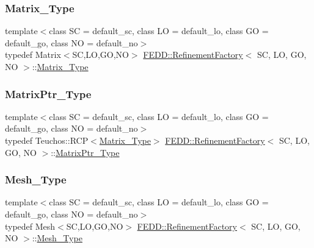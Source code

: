 \subsubsection{\texorpdfstring{Matrix\+\_\+\+Type}{Matrix\_Type}}
{\footnotesize\ttfamily template$<$class SC  = default\+\_\+sc, class LO  = default\+\_\+lo, class GO  = default\+\_\+go, class NO  = default\+\_\+no$>$ \\
typedef Matrix$<$SC,LO,GO,NO$>$ \hyperlink{classFEDD_1_1RefinementFactory}{F\+E\+D\+D\+::\+Refinement\+Factory}$<$ SC, LO, GO, NO $>$\+::\hyperlink{classFEDD_1_1RefinementFactory_ab04c3bb37b70c0524f46b050aaec1914}{Matrix\+\_\+\+Type}}

\mbox{\label{classFEDD_1_1RefinementFactory_a52d5a6625f207bc4df2c5ae3362e8ced}} 
\subsubsection{\texorpdfstring{Matrix\+Ptr\+\_\+\+Type}{MatrixPtr\_Type}}
{\footnotesize\ttfamily template$<$class SC  = default\+\_\+sc, class LO  = default\+\_\+lo, class GO  = default\+\_\+go, class NO  = default\+\_\+no$>$ \\
typedef Teuchos\+::\+R\+CP$<$\hyperlink{classFEDD_1_1RefinementFactory_ab04c3bb37b70c0524f46b050aaec1914}{Matrix\+\_\+\+Type}$>$ \hyperlink{classFEDD_1_1RefinementFactory}{F\+E\+D\+D\+::\+Refinement\+Factory}$<$ SC, LO, GO, NO $>$\+::\hyperlink{classFEDD_1_1RefinementFactory_a52d5a6625f207bc4df2c5ae3362e8ced}{Matrix\+Ptr\+\_\+\+Type}}

\mbox{\label{classFEDD_1_1RefinementFactory_a19f6ea9d9d873657041004fa12f76ac5}} 
\subsubsection{\texorpdfstring{Mesh\+\_\+\+Type}{Mesh\_Type}}
{\footnotesize\ttfamily template$<$class SC  = default\+\_\+sc, class LO  = default\+\_\+lo, class GO  = default\+\_\+go, class NO  = default\+\_\+no$>$ \\
typedef Mesh$<$SC,LO,GO,NO$>$ \hyperlink{classFEDD_1_1RefinementFactory}{F\+E\+D\+D\+::\+Refinement\+Factory}$<$ SC, LO, GO, NO $>$\+::\hyperlink{classFEDD_1_1RefinementFactory_a19f6ea9d9d873657041004fa12f76ac5}{Mesh\+\_\+\+Type}}

